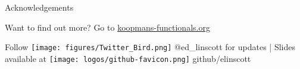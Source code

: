 \documentclass[xcolor=table,aspectratio=169]{beamer}
\numberwithin{equation}{section}
\begin{document}
\begin{frame}{Acknowledgements}
   \begin{center}
      \vspace{1em}
      \small
      Want to find out more? Go to \url{koopmans-functionals.org}
      \vspace{1em}

      Follow \texttt{[image: figures/Twitter\_Bird.png]} \textcolor{twitter_blue}{@ed\_linscott} for updates | Slides available at \texttt{[image: logos/github-favicon.png]} github/elinscott
   \end{center}

   \vspace{2ex}
   \scriptsize


   \vspace{2ex}
   \scriptsize
\end{frame}
\endgroup
\end{document}
